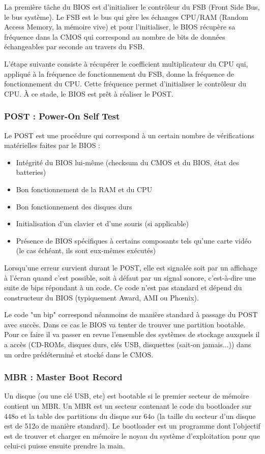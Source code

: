 La première tâche du BIOS est d'initialiser le contrôleur du FSB (Front Side Bus, le bus système). Le FSB est  le bus qui gère les échanges CPU/RAM (Random Access Memory, la mémoire vive) et pour l'initialiser, le BIOS récupère sa fréquence dans la CMOS qui correspond au nombre de bits de données échangeables par seconde au travers du FSB.

L'étape suivante consiste à récupérer le coefficient multiplicateur du CPU qui, appliqué à la fréquence de fonctionnement du FSB, donne la fréquence de fonctionnement du CPU. Cette fréquence permet d’initialiser le contrôleur du CPU. À ce stade, le BIOS est prêt à réaliser le POST. 

\subsubsection{POST : Power-On Self Test}
Le POST est une procédure qui correspond à un certain nombre de vérifications matérielles faites par le BIOS :
\begin{itemize}
    \item Intégrité du BIOS lui-même (checksum du CMOS et du BIOS, état des batteries)
	\item Bon fonctionnement de la RAM et du CPU
    \item Bon fonctionnement des disques durs
    \item Initialisation d'un clavier et d'une souris (si applicable)
    \item Présence de BIOS spécifiques à certains composants tels qu'une carte vidéo (le cas échéant, ils sont eux-mêmes exécutés)
\end{itemize}

Lorsqu'une erreur survient durant le POST, elle est signalée soit par un affichage à l'écran quand c'est possible, soit à défaut par un signal sonore, c'est-à-dire une suite de bips répondant à un code. Ce code n'est pas standard et dépend du constructeur du BIOS (typiquement Award, AMI ou Ph\oe{}nix).

Le code "un bip" correspond néanmoins de manière standard à passage du POST avec succès. Dans ce cas le BIOS va tenter de trouver une partition bootable. Pour ce  faire il va passer en revue l'ensemble des systèmes de stockage auxquels il a accès (CD-ROMs, disques durs, clés USB, disquettes (sait-on jamais...)) dans un ordre prédéterminé et stocké dans le CMOS. 

\subsubsection{MBR : Master Boot Record}
Un disque (ou une clé USB, etc) est bootable si le premier secteur de mémoire contient un MBR. Un MBR est un secteur contenant le code du bootloader sur 448o et la table des partitions du disque sur 64o (la taille du secteur d'un disque est de 512o de manière standard). Le bootloader est un programme dont l'objectif est de trouver et charger en mémoire le noyau du système d'exploitation pour que celui-ci puisse ensuite prendre la main. 

